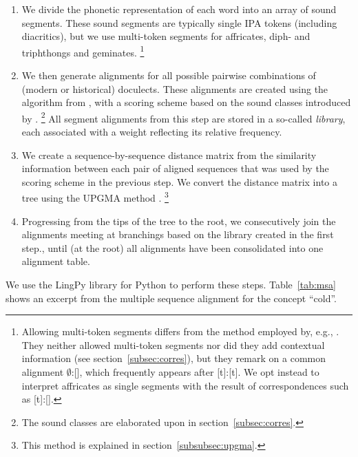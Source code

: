 \documentclass[a4paper]{article}
\begin{document}
\begin{enumerate}
\item
We divide the phonetic representation of each word into an array of sound segments.
These sound segments are typically single IPA tokens (including diacritics),
but we use multi-token segments for affricates, diph- and triphthongs and geminates.%
\footnote{%
Allowing multi-token segments differs from
the method employed by, e.g., \citet{wieling2010hierarchical}.
They neither allowed multi-token segments nor did they add contextual information
(see section~\ref{subsec:corres}),
but they remark on a common alignment $\emptyset$:[\textesh],
which frequently appears after [t]:[t].
We opt instead to interpret affricates as single segments with
the result of correspondences such as [t]:[].
}

\item
We then generate alignments for all possible pairwise combinations
of (modern or historical) doculects.
These alignments are created using the algorithm from \citet{needleman1970general},
with a scoring scheme based on the sound classes introduced by \citet{list2012sca}.%
\footnote{%
The sound classes are elaborated upon in section~\ref{subsec:corres}.
}
All segment alignments from this step are stored in a so-called \textit{library},
each associated with a weight reflecting its relative frequency.

\item
We create a sequence-by-sequence distance matrix
from the similarity information between each pair of aligned sequences
that was used by the scoring scheme in the previous step.
We convert the distance matrix into a tree using the UPGMA method \citep{sokal1958statistical}.%
\footnote{This method is explained in section~\ref{subsubsec:upgma}.}

\item 
Progressing from the tips of the tree to the root,
we consecutively join the alignments meeting at branchings
based on the library created in the first step.,
until (at the root) all alignments have been consolidated into one alignment table.
\end{enumerate}

We use the LingPy library for Python \citep{list2018lingpy} to perform these steps.
Table~\ref{tab:msa}
shows an excerpt from the multiple sequence alignment for the concept ``cold''.
\end{document}
